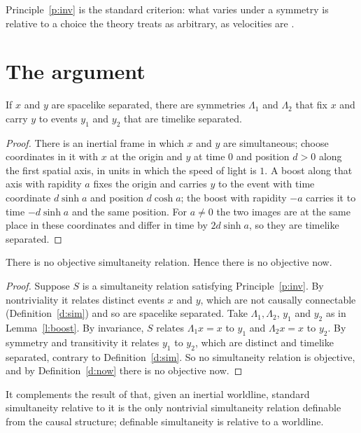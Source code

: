 \documentclass{situationist-preprint}
\begin{document}
Principle~\ref{p:inv} is the standard criterion: what varies under a symmetry is relative to a choice the theory treats as arbitrary, as velocities are \citep{Earman1989}.

\section{The argument}

\begin{lemma}\label{l:boost}
If $x$ and $y$ are spacelike separated, there are symmetries $\Lambda_1$ and $\Lambda_2$ that fix $x$ and carry $y$ to events $y_1$ and $y_2$ that are timelike separated.
\end{lemma}

\begin{proof}
There is an inertial frame in which $x$ and $y$ are simultaneous; choose coordinates in it with $x$ at the origin and $y$ at time $0$ and position $d>0$ along the first spatial axis, in units in which the speed of light is $1$. A boost along that axis with rapidity $a$ fixes the origin and carries $y$ to the event with time coordinate $d\sinh a$ and position $d\cosh a$; the boost with rapidity $-a$ carries it to time $-d\sinh a$ and the same position. For $a\neq 0$ the two images are at the same place in these coordinates and differ in time by $2d\sinh a$, so they are timelike separated.
\end{proof}

\begin{theorem}\label{t:nosim}
There is no objective simultaneity relation. Hence there is no objective now.
\end{theorem}

\begin{proof}
Suppose $S$ is a simultaneity relation satisfying Principle~\ref{p:inv}. By nontriviality it relates distinct events $x$ and $y$, which are not causally connectable (Definition~\ref{d:sim}) and so are spacelike separated. Take $\Lambda_1,\Lambda_2$, $y_1$ and $y_2$ as in Lemma~\ref{l:boost}. By invariance, $S$ relates $\Lambda_1 x = x$ to $y_1$ and $\Lambda_2 x = x$ to $y_2$. By symmetry and transitivity it relates $y_1$ to $y_2$, which are distinct and timelike separated, contrary to Definition~\ref{d:sim}. So no simultaneity relation is objective, and by Definition~\ref{d:now} there is no objective now.
\end{proof}

It complements the result of \citet{Malament1977} that, given an inertial worldline, standard simultaneity relative to it is the only nontrivial simultaneity relation definable from the causal structure; definable simultaneity is relative to a worldline.
\end{document}
